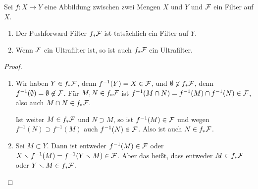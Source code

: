 \begin{lemma}
Sei $f\colon X\to Y$ eine Abbildung zwischen zwei Mengen $X$ und $Y$ und $\cal F$ ein Filter auf $X$.
\begin{enumerate}
\item Der Pushforward-Filter $f_*\cal F$ ist tatsächlich ein Filter auf $Y$.
\item Wenn $\cal F$ ein Ultrafilter ist, so ist auch $f_*\cal F$ ein Ultrafilter.
\end{enumerate}
\end{lemma}
\begin{proof}\leavevmode
\begin{enumerate}
\item Wir haben $Y\in f_*\cal F$, denn $f^{-1}(Y) = X\in\cal F$, und $\emptyset\not\in f_*\cal F$, denn $f^{-1}(\emptyset) = \emptyset\not\in\cal F$. Für $M,N\in f_*\cal F$ ist $f^{-1}(M\cap N) = f^{-1}(M)\cap f^{-1}(N)\in\cal F$, also auch $M\cap N\in f_*\cal F$.

Ist weiter $M\in f_*\cal F$ und $N\supset M$, so ist $f^{-1}(M)\in\cal F$ und wegen $f^{-1}(N)\supset f^{-1}(M)$ auch $f^{-1}(N)\in \cal F$. Also ist auch $N\in f_*\cal F$.
\item Sei $M\subset Y$. Dann ist entweder $f^{-1}(M)\in\cal F$ oder $X\setminus f^{-1}(M) = f^{-1}(Y\setminus M)\in\cal F$. Aber das heißt, dass entweder $M\in f_*\cal F$ oder $Y\setminus M\in f_*\cal F$.\qedhere
\end{enumerate}
\end{proof}

